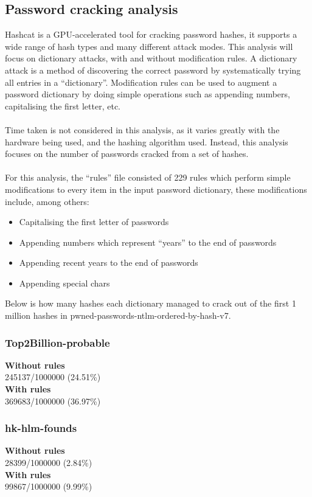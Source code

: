 \documentclass[11pt]{article}
\begin{document}
\subsection{Password cracking analysis}
Hashcat is a GPU-accelerated tool for cracking password hashes, it supports a wide range of hash types and many different attack modes.
This analysis will focus on dictionary attacks, with and without modification rules.
A dictionary attack is a method of discovering the correct password by systematically trying all entries in a ``dictionary''.
Modification rules can be used to augment a password dictionary by doing simple operations such as appending numbers, capitalising the first letter, etc.\\\\
Time taken is not considered in this analysis, as it varies greatly with the hardware being used, and the hashing algorithm used.
Instead, this analysis focuses on the number of passwords cracked from a set of hashes.\\\\
For this analysis, the ``rules'' file consisted of 229 rules which perform simple modifications to every item in the input password dictionary, these modifications include, among others:
\begin{itemize}
\item Capitalising the first letter of passwords
\item Appending numbers which represent ``years'' to the end of passwords
\item Appending recent years to the end of passwords
\item Appending special chars
\end{itemize}
Below is how many hashes each dictionary managed to crack out of the first 1 million hashes in pwned-passwords-ntlm-ordered-by-hash-v7.
\subsubsection{Top2Billion-probable}
\textbf{Without rules}\\
245137/1000000 (24.51\%)\\
\textbf{With rules}\\
369683/1000000 (36.97\%)
\subsubsection{hk-hlm-founds}
\textbf{Without rules}\\
28399/1000000 (2.84\%)\\
\textbf{With rules}\\
99867/1000000 (9.99\%)
\end{document}
